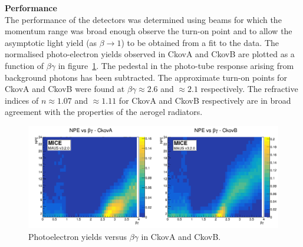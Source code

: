 \noindent\textbf{Performance} \\
\noindent
The performance of the detectors was determined using beams for which
the momentum range was broad enough observe the turn-on point and to
allow the asymptotic light yield (as $\beta \rightarrow 1$) to be
obtained from a fit to the data.
The normalised photo-electron yields observed in CkovA and CkovB are
plotted as a function of $\beta\gamma$ in
figure~\ref{fig:ckov_betagamma}.
The pedestal in the photo-tube response arising from background
photons has been subtracted.
The approximate turn-on points for CkovA and CkovB were found at
$\beta\gamma \approx 2.6$ and $\approx 2.1$ respectively.
The refractive indices of $n \approx 1.07$ and $\approx 1.11$ for
CkovA and CkovB respectively are in broad agreement with the
properties of the aerogel radiators. 
\begin{figure}
  \begin{center}
    \includegraphics[width=0.90\columnwidth]{./03-Ckov/Figures/scatter_betagamma_logo.png}
    \caption{Photoelectron yields versus $\beta\gamma$ in CkovA and CkovB.}
    \label{fig:ckov_betagamma}
  \end{center}
\end{figure}
